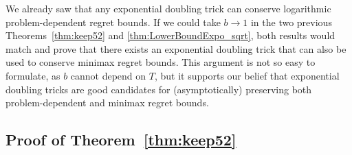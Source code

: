 \documentclass[12pt]{colt2018} %
\begin{document}


We already saw that any exponential doubling trick can conserve logarithmic problem-dependent regret bounds.
If we could take $b\to1$ in the two previous Theorems~\ref{thm:keep52} and \ref{thm:LowerBoundExpo_sqrt},
both results would match and prove that there exists an exponential doubling trick that can also be used to conserve minimax regret bounds.
%
This argument is not so easy to formulate, as $b$ cannot depend on $T$, but it supports our belief that exponential doubling tricks are good candidates for (asymptotically) preserving both problem-dependent and minimax regret bounds.



\subsection{Proof of Theorem~\ref{thm:keep52}} \label{proof:Keep52}
\end{document}
